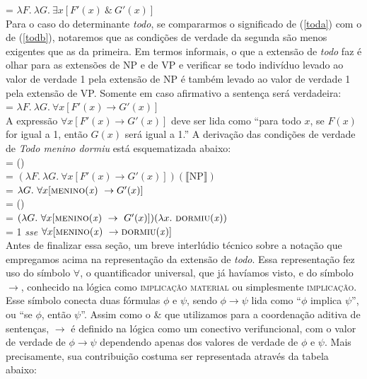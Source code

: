 \n {} = $\lambda F.\ \lambda G.\ \exists x [ F'(x)\ \& \ G'(x)]$\\

Para o caso do determinante \textit{todo}, se compararmos o significado de (\ref{toda}) com o de
(\ref{todb}), notaremos que as condições de verdade da segunda são
menos exigentes que as da primeira. Em termos informais, o que a
extensão de \textit{todo} faz é olhar para as extensões de NP e de VP e
verificar se todo indivíduo levado ao valor de verdade 1 pela
extensão de NP é também levado ao valor de verdade 1 pela extensão
de VP. Somente em caso afirmativo a sentença será
verdadeira:\\

\n {} = $\lambda F.\ \lambda G.\ \forall x [F'(x) \rightarrow G'(x)]$\\

\n A expressão $\forall x [ F'(x) \rightarrow G'(x)]$ deve ser lida como ``para todo $x$, se $F(x)$ for igual a 1, então $G(x)$ será igual a 1.'' A derivação das condições de verdade de \textit{Todo menino dormiu} está esquematizada abaixo:\\

\n {} =
()\\

\n = $(\lambda F.\ \lambda G.\ \forall x [F'(x) \rightarrow G'(x)])(\llbracket \text{NP}
\rrbracket)$\\

\n = $\lambda G.\ \forall x [ \text{\textsc{menino}(\textit{x})}\ \rightarrow G'(x)]$\\

\n {} =
()\\

\n = $(\lambda G.\ \forall x [\predica{menino}{x}\ \rightarrow \ G'(x)])(\lambda x.\ \predica{dormiu}{x})$\\

\n = 1 \textit{sse} $\forall x [\text{\textsc{menino}(\textit{x})}\ \rightarrow \text{\textsc{dormiu}(\textit{x})}]$\\

Antes de finalizar essa seção, um breve interlúdio técnico sobre a notação que empregamos acima na representação da extensão de \textit{todo}. Essa representação fez uso do símbolo $\forall$, o quantificador universal, que já havíamos visto, e do símbolo $\rightarrow$, conhecido na lógica como \textsc{implicação material} ou simplesmente \textsc{implicação}. Esse símbolo conecta duas fórmulas $\phi$ e $\psi$, sendo $\phi \rightarrow \psi$ lida como ``$\phi$ implica $\psi$'', ou ``se $\phi$, então $\psi$''. Assim como o \& que utilizamos para a coordenação aditiva de sentenças, $\rightarrow$ é definido na lógica como um conectivo verifuncional, com o valor de verdade de $\phi \rightarrow \psi$ dependendo apenas dos valores de verdade de $\phi$ e $\psi$. Mais precisamente, sua contribuição costuma ser representada através da tabela abaixo:

